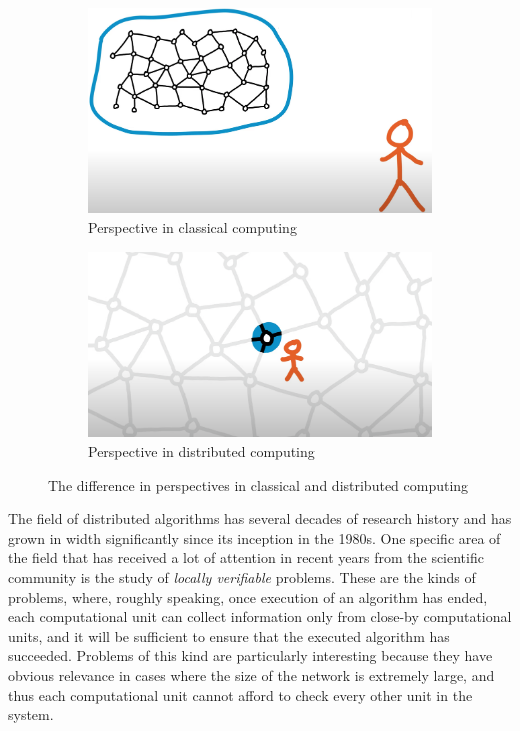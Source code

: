 \begin{figure}
  \centering
  \begin{subfigure}[b]{0.49\textwidth}
      \centering
      \includegraphics[width=\textwidth]{images/classical-computing.png}
      \caption{Perspective in classical computing}
      \label{fig:classical-computing}
  \end{subfigure}
  \hfill
  \begin{subfigure}[b]{0.49\textwidth}
      \centering
      \includegraphics[width=\textwidth]{images/distributed-computing.png}
      \caption{Perspective in distributed computing}
      \label{fig:three sin x}
  \end{subfigure}
  \caption{The difference in perspectives in classical and distributed computing}
  \label{fig:classical-vs-distributed-computing}
\end{figure}

The field of distributed algorithms has several
decades of research history and has grown
in width significantly since its inception in the 1980s.
One specific
area of the field that has received a lot of
attention in recent years from the scientific
community is the study of \emph{locally verifiable}
problems.
These are the kinds of problems, where, roughly speaking,
once execution of an algorithm has ended, each
computational unit can
collect information only from close-by computational units,
and it will be sufficient to ensure that the executed algorithm has succeeded. Problems of this kind are particularly
interesting because they have obvious relevance
in cases where the size of the network is extremely
large, and thus each computational unit
cannot afford to check every other unit in the system.

